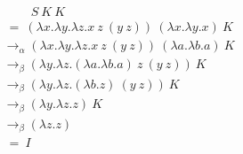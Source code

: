 \documentclass{article}
\begin{document}
\[
\begin{aligned}
& \quad\quad~S~                                        K~                      K \\
& ~ = ~      (\lambda x.\lambda y.\lambda z.x~z~(y~z))~(\lambda x.\lambda y.x)~K \\
& \to_\alpha (\lambda x.\lambda y.\lambda z.x~z~(y~z))~(\lambda a.\lambda b.a)~K \\
& \to_\beta            (\lambda y.\lambda z.(\lambda a.\lambda b.a)~z~(y~z))~  K \\
& \to_\beta            (\lambda y.\lambda z.(\lambda b.z)~            (y~z))~  K \\
& \to_\beta            (\lambda y.\lambda z.z)~                                K \\
& \to_\beta                      (\lambda z.z)                                   \\
& ~ = ~                          I
\end{aligned}
\]
\end{document}
